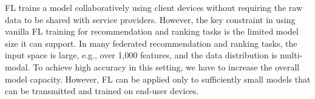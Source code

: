 \documentclass{article}
\begin{document}

FL trains a model collaboratively using client devices without requiring the raw data to be shared with service providers.
%
%
%
However, the key constraint in using vanilla FL training for recommendation and ranking tasks is the limited model size it can support. In many federated recommendation and ranking tasks, the input space is large, e.g., over 1{,}000 features, and the data distribution is multi-modal. To achieve high accuracy in this setting, we have to increase the overall model capacity. However, FL can be applied only to sufficiently small models that can be transmitted and trained on end-user devices.
\end{document}
